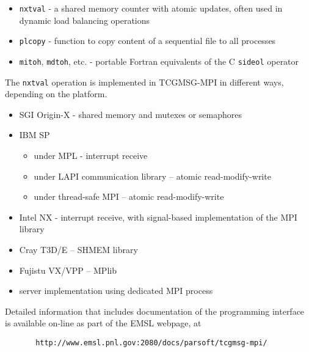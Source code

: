 \begin{itemize}
\item {\tt nxtval} - a shared memory counter with atomic updates, often used in
dynamic load balancing operations
\item {\tt plcopy} - function to copy content of a sequential file to all processes
\item {\tt mitoh}, {\tt mdtoh}, etc. - portable Fortran equivalents of the C {\tt sideol} operator
\end{itemize}

The {\tt nxtval} operation is implemented in TCGMSG-MPI in different ways, depending
on the platform.

\begin{itemize}
\item SGI Origin-X - shared memory and mutexes or semaphores
\item IBM SP 
\begin{itemize}
\item under MPL - interrupt receive
\item under LAPI communication library -- atomic read-modify-write
\item under thread-safe MPI -- atomic read-modify-write
\end{itemize}
\item Intel NX - interrupt receive, with signal-based implementation 
of the MPI library
\item Cray T3D/E -- SHMEM library
\item Fujistu VX/VPP -- MPlib
\item server implementation using dedicated MPI process
\end{itemize}

Detailed information that includes
documentation of the programming interface is available on-line as part
of the EMSL webpage, at

\begin{verbatim}
       http://www.emsl.pnl.gov:2080/docs/parsoft/tcgmsg-mpi/
\end{verbatim}

